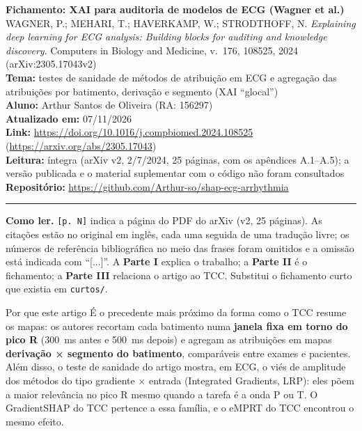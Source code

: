 \documentclass[11pt,a4paper]{article}
\begin{document}
\begin{center}
    {\LARGE \textbf{Fichamento: XAI para auditoria de modelos de ECG (Wagner et al.)}} \\[0.35em]
    {\large WAGNER, P.; MEHARI, T.; HAVERKAMP, W.; STRODTHOFF, N. \textit{Explaining deep learning for ECG analysis: Building blocks for auditing and knowledge discovery}. Computers in Biology and Medicine, v.~176, 108525, 2024 (arXiv:2305.17043v2)} \\[0.3em]
    \textbf{Tema:} testes de sanidade de métodos de atribuição em ECG e agregação das atribuições por batimento, derivação e segmento (XAI “glocal”) \\[0.2em]
    \textbf{Aluno:} Arthur Santos de Oliveira (RA: 156297) \\[0.2em]
    \textbf{Atualizado em:} 07/11/2026 \\[0.2em]
    \textbf{Link:} \url{https://doi.org/10.1016/j.compbiomed.2024.108525} \quad (\url{https://arxiv.org/abs/2305.17043}) \\[0.2em]
    \textbf{Leitura:} íntegra (arXiv v2, 2/7/2024, 25 páginas, com os apêndices A.1--A.5); a versão publicada e o material suplementar com o código não foram consultados \\[0.2em]
    \textbf{Repositório:} \url{https://github.com/Arthur-so/shap-ecg-arrhythmia}
\end{center}
\vspace{-0.5em}
\hrule
\vspace{0.8em}

\textbf{Como ler.} \texttt{[p. N]} indica a página do PDF do arXiv (v2, 25 páginas). As citações estão no original em inglês, cada uma seguida de uma tradução livre; os números de referência bibliográfica no meio das frases foram omitidos e a omissão está indicada com “[...]”. A \textbf{Parte I} explica o trabalho; a \textbf{Parte II} é o fichamento; a \textbf{Parte III} relaciona o artigo ao TCC. Substitui o fichamento curto que existia em \texttt{curtos/}.

\begin{infobox}[note]{Por que este artigo}
É o precedente mais próximo da forma como o TCC resume os mapas: os autores recortam cada batimento numa \textbf{janela fixa em torno do pico R} (300~ms antes e 500~ms depois) e agregam as atribuições em mapas \textbf{derivação × segmento do batimento}, comparáveis entre exames e pacientes. Além disso, o teste de sanidade do artigo mostra, em ECG, o viés de amplitude dos métodos do tipo gradiente × entrada (Integrated Gradients, LRP): eles põem a maior relevância no pico R mesmo quando a tarefa é a onda P ou T. O GradientSHAP do TCC pertence a essa família, e o eMPRT do TCC encontrou o mesmo efeito.
\end{infobox}
\end{document}
